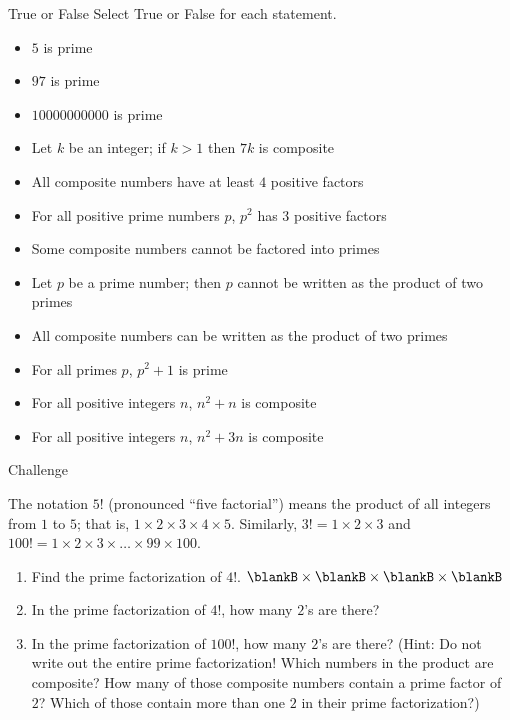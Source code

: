 \documentclass[12pt,letterpaper]{article}
\begin{document}
\begin{problem}{True or False}
Select True or False for each statement.

\begin{itemize}
  \item $5$ is prime \hfill \TFTrue
  \item $97$ is prime \hfill \TFTrue
  \item $10000000000$ is prime \hfill \TFFalse
  \item Let \(k\) be an integer; if \(k>1\) then $7k$ is composite \hfill
  \TFTrue
  \item All composite numbers have at least \(4\) positive factors
  \hfill \TFFalse
  \item For all positive prime numbers \(p\), \(p^2\) has \(3\) positive factors
  \hfill \TFTrue
  \item Some composite numbers cannot be factored into primes
  \hfill \TFFalse
  \item Let \(p\) be a prime number; then \(p\) cannot be written as the
  product of two primes \hfill \TFTrue
  \item All composite numbers can be written as the product of two primes
  \hfill \TFFalse
  \item For all primes \(p\), \(p^2 + 1\) is prime \hfill \TFFalse
  \item For all positive integers \(n\), \(n^2 + n\) is composite \hfill
  \TFFalse
  \item For all positive integers \(n\), \(n^2 + 3n\) is composite \hfill
  \TFTrue
 \end{itemize}

\end{problem}

\begin{problem}{Challenge}

The notation $5!$ (pronounced ``five factorial'') means the product of all
integers from $1$ to $5$; that is, $1 \times 2 \times 3 \times 4 \times 5$.
Similarly, $3! = 1 \times 2 \times 3$ and $100! = 1 \times 2 \times 3
\times\dots\times 99 \times 100$.

\begin{enumerate}
 \item Find the prime factorization of $4!$. \hfill
 $\blankB \times \blankB \times \blankB \times \blankB$
 \item In the prime factorization of $4!$, how many $2$'s are there?
 \item In the prime factorization of $100!$, how many $2$'s are there? (Hint: Do
 not write out the entire prime factorization! Which numbers in the product are
 composite? How many of those composite numbers contain a prime factor of $2$?
 Which of those contain more than one $2$ in their prime factorization?)
\end{enumerate}

\end{problem}
\end{document}
